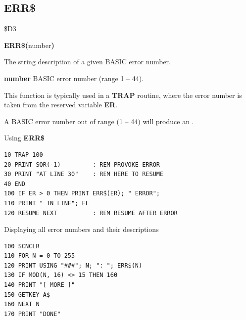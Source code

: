 \subsection{ERR\$}
\begin{description}[leftmargin=2cm,style=nextline]
\item [Token:]    \$D3

\item [Format:]   {\bf ERR\$(}number{\bf)}

\item [Returns:]  The string description of a given BASIC error number.

                  {\bf number} BASIC error number (range  1 -- 44).

                  This function is typically used in a {\bf TRAP} routine, where the error number is taken from the reserved variable {\bf ER}.

\item [Remarks:]  A BASIC error number out of range (1 -- 44) will produce an .

\item [Examples:] Using {\bf ERR\$}

\begin{tcolorbox}[colback=black,coltext=white]
\verbatimfont{\codefont}
\begin{verbatim}
10 TRAP 100
20 PRINT SQR(-1)         : REM PROVOKE ERROR
30 PRINT "AT LINE 30"    : REM HERE TO RESUME
40 END
100 IF ER > 0 THEN PRINT ERR$(ER); " ERROR";
110 PRINT " IN LINE"; EL
120 RESUME NEXT          : REM RESUME AFTER ERROR
\end{verbatim}
\end{tcolorbox}

                  Displaying all error numbers and their descriptions

\begin{tcolorbox}[colback=black,coltext=white]
\verbatimfont{\codefont}
\begin{verbatim}
100 SCNCLR
110 FOR N = 0 TO 255
120 PRINT USING "###"; N; ": "; ERR$(N)
130 IF MOD(N, 16) <> 15 THEN 160
140 PRINT "[ MORE ]"
150 GETKEY A$
160 NEXT N
170 PRINT "DONE"
\end{verbatim}
\end{tcolorbox}
\end{description}


\newpage
